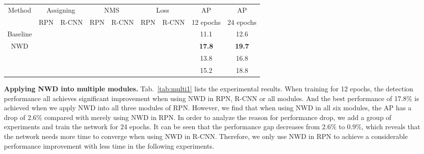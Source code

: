 \documentclass{article}
\newcommand{\fixedvskip}{-3mm}
\begin{document}
\begin{table*}[t]
	\centering
\setlength{\belowcaptionskip}{0.2cm}
\caption{Ablation experiments when NWD is applied to multiple modules.}
	\begin{tabular}{|c|cc|cc|cc|c|c|}  
	\hline
	\multirow{2}{*}{Method} & \multicolumn{2}{c|}{Assigning}  & \multicolumn{2}{c|}{NMS}  & \multicolumn{2}{c|}{Loss} & AP & AP \\
      & RPN & R-CNN & RPN & R-CNN & RPN & R-CNN & 12 epochs & 24 epochs\\
	\hline
	Baseline & & & & & & & 11.1 & 12.6 \\
	\hline
	\multirow{3}{*}{NWD} & \checkmark &  & \checkmark &  &\checkmark  &  & \textbf{17.8} & \textbf{19.7} \\
	                     &  & \checkmark &  & \checkmark &  & \checkmark & 13.8 & 16.8 \\
	                     & \checkmark & \checkmark & \checkmark & \checkmark & \checkmark & \checkmark & 15.2 & 18.8 \\
	                         
	\hline
	\end{tabular}
	\label{tab:multi1}
	\vspace{\fixedvskip}
\end{table*}

\textbf{Applying NWD into multiple modules.} Tab.~\ref{tab:multi1} lists the experimental results. When training for 12 epochs, the detection performance all achieves significant improvement when using NWD in RPN, R-CNN or all modules. And the best performance of 17.8\% is achieved when we apply NWD into all three modules of RPN. However, we find that when using NWD in all six modules, the AP has a drop of 2.6\% compared with merely using NWD in RPN. In order to analyze the reason for performance drop, we add a group of experiments and train the network for 24 epochs. It can be seen that the performance gap decreases from 2.6\% to 0.9\%, which reveals that the network needs more time to converge when using NWD in R-CNN. Therefore, we only use NWD in RPN to achieve a considerable performance improvement with less time in the following experiments.
\end{document}
